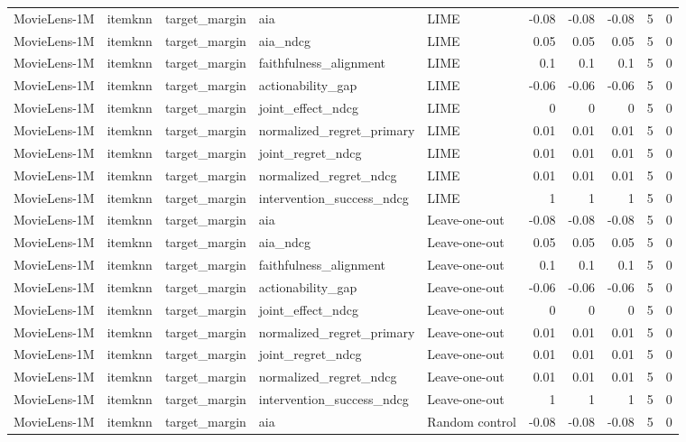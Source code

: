 \begin{table}[t]
{\begin{tabular}{lllllrrrrr}
MovieLens-1M & itemknn & target\_margin & aia & LIME & -0.08 & -0.08 & -0.08 & 5 & 0 \\
MovieLens-1M & itemknn & target\_margin & aia\_ndcg & LIME & 0.05 & 0.05 & 0.05 & 5 & 0 \\
MovieLens-1M & itemknn & target\_margin & faithfulness\_alignment & LIME & 0.1 & 0.1 & 0.1 & 5 & 0 \\
MovieLens-1M & itemknn & target\_margin & actionability\_gap & LIME & -0.06 & -0.06 & -0.06 & 5 & 0 \\
MovieLens-1M & itemknn & target\_margin & joint\_effect\_ndcg & LIME & 0 & 0 & 0 & 5 & 0 \\
MovieLens-1M & itemknn & target\_margin & normalized\_regret\_primary & LIME & 0.01 & 0.01 & 0.01 & 5 & 0 \\
MovieLens-1M & itemknn & target\_margin & joint\_regret\_ndcg & LIME & 0.01 & 0.01 & 0.01 & 5 & 0 \\
MovieLens-1M & itemknn & target\_margin & normalized\_regret\_ndcg & LIME & 0.01 & 0.01 & 0.01 & 5 & 0 \\
MovieLens-1M & itemknn & target\_margin & intervention\_success\_ndcg & LIME & 1 & 1 & 1 & 5 & 0 \\
MovieLens-1M & itemknn & target\_margin & aia & Leave-one-out & -0.08 & -0.08 & -0.08 & 5 & 0 \\
MovieLens-1M & itemknn & target\_margin & aia\_ndcg & Leave-one-out & 0.05 & 0.05 & 0.05 & 5 & 0 \\
MovieLens-1M & itemknn & target\_margin & faithfulness\_alignment & Leave-one-out & 0.1 & 0.1 & 0.1 & 5 & 0 \\
MovieLens-1M & itemknn & target\_margin & actionability\_gap & Leave-one-out & -0.06 & -0.06 & -0.06 & 5 & 0 \\
MovieLens-1M & itemknn & target\_margin & joint\_effect\_ndcg & Leave-one-out & 0 & 0 & 0 & 5 & 0 \\
MovieLens-1M & itemknn & target\_margin & normalized\_regret\_primary & Leave-one-out & 0.01 & 0.01 & 0.01 & 5 & 0 \\
MovieLens-1M & itemknn & target\_margin & joint\_regret\_ndcg & Leave-one-out & 0.01 & 0.01 & 0.01 & 5 & 0 \\
MovieLens-1M & itemknn & target\_margin & normalized\_regret\_ndcg & Leave-one-out & 0.01 & 0.01 & 0.01 & 5 & 0 \\
MovieLens-1M & itemknn & target\_margin & intervention\_success\_ndcg & Leave-one-out & 1 & 1 & 1 & 5 & 0 \\
MovieLens-1M & itemknn & target\_margin & aia & Random control & -0.08 & -0.08 & -0.08 & 5 & 0 \\

\end{tabular}}
\end{table}
